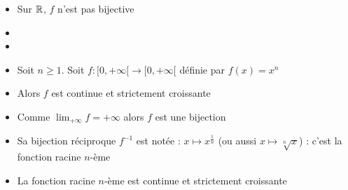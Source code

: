 \begin{frame}

\begin{exemple}[$f(x)=x^2$]
\begin{itemize}
  \item Sur $\mathbb{R}$, $f$ n'est pas bijective


  \item \uncover<2->{$
f_1 :
\left\{\begin{array}{c}
]-\infty,0] \longrightarrow [0,+\infty[ \\
x \longmapsto x^2
\end{array}\right.
\quad \text{et } \quad
f_2 : 
\left\{\begin{array}{c}
[0,+\infty[ \longrightarrow [0,+\infty[ \\
x \longmapsto x^2
\end{array}\right.
$
}
\vspace*{-1.5ex}
\item  {}
  
\end{itemize}



\vspace*{-3ex}
\vspace*{-3.5ex}
\end{exemple}
  
\end{frame}





\begin{frame}

\begin{exemple}

\begin{itemize}
  \item Soit $n\ge 1$. Soit $f : [0,+\infty[ \to [0,+\infty[$ définie par $f(x)=x^n$
\pause  
  \item Alors $f$ est continue et strictement croissante
\pause   
  \item Comme $\lim_{+\infty} f = +\infty$ alors $f$ est une bijection
\pause   
  \item Sa bijection réciproque $f^{-1}$ est notée : $x \mapsto x^{\frac{1}{n}}$
(ou aussi $x \mapsto \sqrt[n]{x}$) : c'est la fonction racine $n$-ème
\pause   
  \item La fonction racine $n$-ème est continue et strictement croissante 
\end{itemize}
\end{exemple}

\end{frame}

